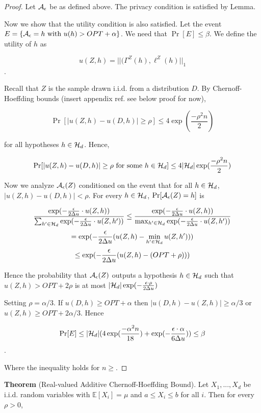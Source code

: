 \begin{proof}
	Let $\mathcal{A}_{\epsilon}$ be as defined above. The privacy condition is
  satisfied by Lemma.

	Now we show that the utility condition is also satisfied. Let the
  event $E = \{\mathcal{A}_{\epsilon} = h \text{ with } u(h) > OPT + \alpha\}$. We
  need that $\Pr[E] \leq \beta$. We define the utility of $h$ as

	$$u(Z,h) = ||(\Gamma^Z(h), \ell^Z(h)||_{1}$$.

	Recall that $Z$ is the sample drawn i.i.d. from a distribution $D$.
  By Chernoff-Hoeffding bounds (insert appendix ref. see below proof
  for now),

	$$\Pr[|u(Z,h) - u(D,h)| \geq \rho] \leq 4\exp(\frac{-\rho^2n}{2})$$

	for all hypotheses $h \in \mathcal{H}_d$. Hence,

	$$\Pr[|u(Z,h) - u(D,h)| \geq \rho \text{ for some } h \in \mathcal{H}_d] \leq 4|\mathcal{H}_d|\exp(\frac{-\rho^2n}{2})$$

	Now we analyze $\mathcal{A}_\epsilon(Z)$ conditioned on the event that for all
  $h\in \mathcal{H}_d$, $|u(Z,h) - u(D,h)| < \rho$. For every $h \in \mathcal{H}_d$, $\Pr[\mathcal{A}_\epsilon(Z) = h]$ is

	$$\frac{\exp(-\frac{\epsilon}{2\Delta u} \cdot
  u(Z,h))}{\sum_{h'\in\mathcal{H}_d}\exp(-\frac{\epsilon}{2\Delta u} \cdot u(Z,h'))}
  \leq \frac{\exp(-\frac{\epsilon}{2\Delta u} \cdot
  u(Z,h))}{\max_{h'\in\mathcal{H}_d}\exp(-\frac{\epsilon}{2\Delta u} \cdot u(Z,h'))} $$
	$$= \exp(-\frac{\epsilon}{2\Delta u}(u(Z,h) - \min_{h'\in\mathcal{H}_d}u(Z,h')))$$
	$$\leq \exp(-\frac{\epsilon}{2\Delta u}(u(Z,h) - (OPT + \rho)))$$

	Hence the probability that $\mathcal{A}_\epsilon(Z)$ outputs a hypothesis $h \in
  \mathcal{H}_d$ such that $u(Z,h) > OPT + 2\rho$ is at most
  $|\mathcal{H}_d|\exp(-\frac{\epsilon\cdot\rho}{2\Delta u})$

	Setting $\rho = \alpha/3$. If $u(D,h) \geq OPT + \alpha$ then
  $|u(D,h) - u(Z,h)| \geq \alpha/3$ or $u(Z,h) \geq OPT + 2\alpha/3$.
  Hence

	$$\Pr[E] \leq |\mathcal{H}_d|(4\exp(\frac{-\alpha^2n}{18}) + \exp(-\frac{\epsilon\cdot\alpha}{6\Delta u})) \leq \beta$$.

	Where the inequality holds for $n \geq $.
\end{proof}
{\bf Theorem} (Real-valued Additive Chernoff-Hoeffding Bound). Let
$X_1,...,X_d$ be i.i.d. random variables with $\mathbb{E}[X_i] = \mu$
and $a \leq X_i \leq b$ for all $i$. Then for every $\rho > 0$,

